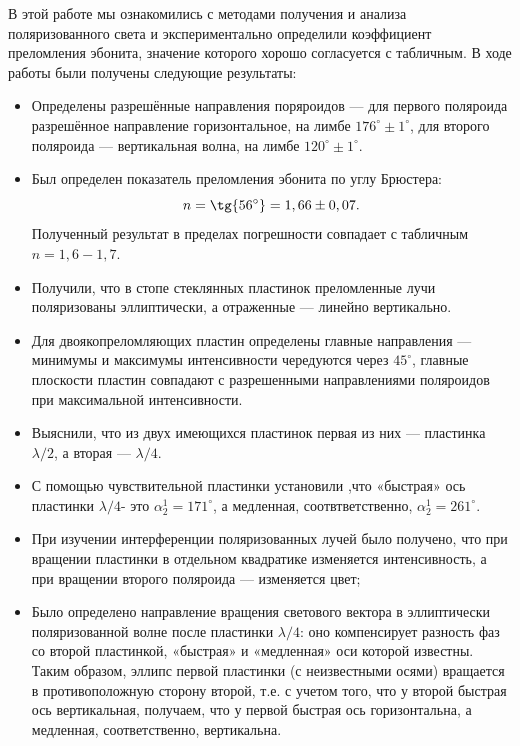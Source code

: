 \documentclass[a4paper,12pt]{article}
\begin{document}
В этой работе мы ознакомились с методами получения и анализа поляризованного света и экспериментально определили коэффициент преломления эбонита, значение которого хорошо согласуется с табличным. В ходе работы были получены следующие результаты:
\begin{itemize}
\item Определены разрешённые направления поряроидов --- для первого поляроида разрешённое направление горизонтальное, на лимбе $176^{\circ} \pm 1^{\circ}$, для второго поляроида --- вертикальная волна, на лимбе $120^{\circ} \pm 1^{\circ}$.
\item Был определен показатель преломления эбонита по углу Брюстера:
\begin{equation*}
    n = \tg{56^{\circ}} = 1,66 \pm 0,07.
\end{equation*}
Полученный результат в пределах погрешности совпадает с табличным $n = 1,6 - 1,7$.
\item Получили, что в стопе стеклянных пластинок преломленные лучи поляризованы эллиптически, а отраженные --- линейно вертикально.
\item Для двоякопреломляющих пластин определены главные направления --- минимумы и
максимумы интенсивности чередуются через $45^{\circ}$, главные плоскости пластин совпадают с разрешенными направлениями поляроидов при максимальной интенсивности. 
\item Выяснили, что из двух имеющихся пластинок первая из них --- пластинка $\lambda/2$, а вторая --- $\lambda/4$.
\item С помощью чувствительной пластинки установили ,что «быстрая» ось пластинки $\lambda/4$- это $\alpha_2^1 = 171^\circ$, а медленная, соотвтветственно, $\alpha_2^1 = 261^\circ$.   
\item При изучении интерференции поляризованных лучей было получено, что при вращении пластинки в отдельном квадратике изменяется интенсивность, а при вращении второго поляроида --- изменяется цвет;
\item Было определено направление вращения светового вектора в эллиптически поляризованной волне после пластинки $\lambda/4$: оно компенсирует разность фаз со второй пластинкой, «быстрая» и «медленная» оси которой известны. Таким образом, эллипс первой пластинки (с неизвестными осями) вращается в противоположную сторону второй, т.е. с учетом того, что у второй быстрая ось вертикальная, получаем, что у первой быстрая ось горизонтальна, а медленная, соответственно, вертикальна.
\end{itemize}
\end{document}
